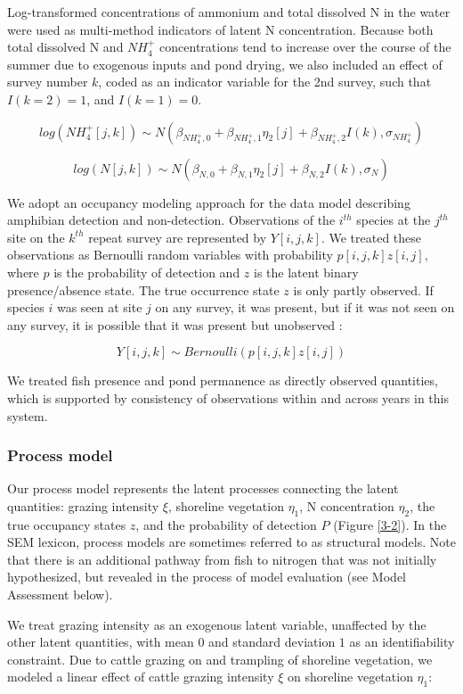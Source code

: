Log-transformed concentrations of ammonium and total dissolved N in the
water were used as multi-method indicators of latent N concentration.
Because both total dissolved N and $NH_4^+$ concentrations tend to
increase over the course of the summer due to exogenous inputs and pond
drying, we also included an effect of survey number $k$, coded as an
indicator variable for the 2nd survey, such that $I(k=2)=1$, and
$I(k=1)=0$.

\[ log(NH_4^+[j, k]) \sim N(\beta_{NH_4^+, 0} + \beta_{NH_4^+, 1} \eta_2[j] + \beta_{NH_4^+, 2} I(k), \sigma_{NH_4^+}) \]

\[ log(N[j, k]) \sim N(\beta_{N, 0} + \beta_{N, 1} \eta_2[j] + \beta_{N, 2} I(k), \sigma_N) \]

We adopt an occupancy modeling approach for the data model describing
amphibian detection and non-detection. Observations of the $i^{th}$
species at the $j^{th}$ site on the $k^{th}$ repeat survey are
represented by $Y[i, j, k]$. We treated these observations as Bernoulli
random variables with probability $p[i, j, k] z[i, j]$, where $p$ is the
probability of detection and $z$ is the latent binary presence/absence
state. The true occurrence state $z$ is only partly observed. If species
$i$ was seen at site $j$ on any survey, it was present, but if it was
not seen on any survey, it is possible that it was present but
unobserved \citep{MacKenzie2002}:

\[ Y[i, j, k] \sim Bernoulli(p[i, j, k] z[i, j]) \]

We treated fish presence and pond permanence as directly observed
quantities, which is supported by consistency of observations within and
across years in this system.

\subsubsection{Process model}\label{process-model}

Our process model represents the latent processes connecting the latent
quantities: grazing intensity $\xi$, shoreline vegetation $\eta_1$, N
concentration $\eta_2$, the true occupancy states $z$, and the
probability of detection $P$ (Figure \ref{3-2}). In the SEM lexicon, process
models are sometimes referred to as structural models. Note that there
is an additional pathway from fish to nitrogen that was not initially
hypothesized, but revealed in the process of model evaluation (see Model
Assessment below).

We treat grazing intensity as an exogenous latent variable, unaffected
by the other latent quantities, with mean $0$ and standard deviation $1$
as an identifiability constraint. Due to cattle grazing on and trampling
of shoreline vegetation, we modeled a linear effect of cattle grazing
intensity $\xi$ on shoreline vegetation $\eta_1$:

